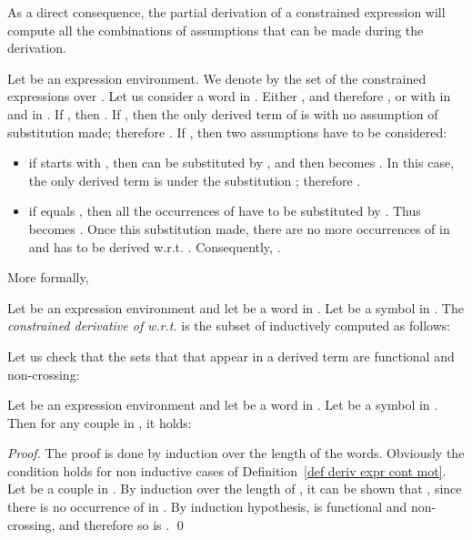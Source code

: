 \documentclass[a4paper]{llncs}
\begin{document}
  As a direct consequence, the partial derivation of a constrained expression will compute all the combinations of assumptions that can be made during the derivation.



Let  be an expression environment.
  We denote by  the set of the constrained expressions over . 
  Let us consider a word  in .
  Either , and therefore , or  with  in  and  in .
  If , then . 
  If , then the only derived term of  is  with no assumption of substitution made; therefore .
  If , then two assumptions have to be considered:
  \begin{itemize}
    \item if  starts with , then  can be substituted by , and then  becomes . In this case, the only derived term is  under the substitution ; therefore .
    \item if  equals , then all the occurrences of  have to be substituted by . 
    Thus  becomes . 
    Once this substitution made, there are no more occurrences of  in  and  has to be derived w.r.t. .
    Consequently, .
  \end{itemize} 
  More formally,
  \begin{definition}\label{def deriv expr cont mot}
    Let  be an expression environment and let  be a word in . 
    Let  be a symbol in . 
    The \emph{constrained derivative of}  \emph{w.r.t.}  is the subset  of  inductively computed as follows:
    
  \end{definition}
  
Let us check that the sets that that appear in a derived term are functional and non-crossing: 
  \begin{lemma}\label{lem ens deriv part ok}
    Let  be an expression environment and let  be a word in . 
    Let  be a symbol in . 
    Then for any couple  in , it holds:
    
  \end{lemma}
  \begin{proof}
    The proof is done by induction over the length of the words.
    Obviously the condition holds for non inductive cases of Definition~\ref{def deriv expr cont mot}.
    Let  be a couple in .
    By induction over the length of , it can be shown that , since there is no occurrence of  in .
    By induction hypothesis,  is functional and non-crossing, and therefore so is .
    \qed
  \end{proof}
  
\end{document}
